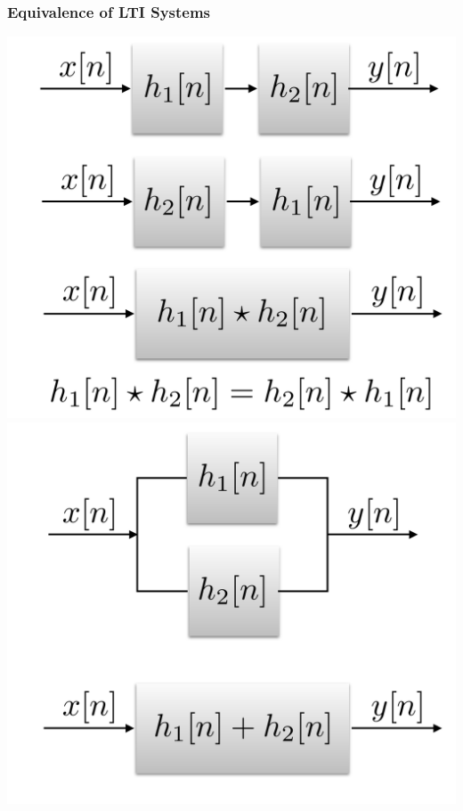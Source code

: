 \documentclass[mathserif,9pt]{beamer}
\begin{document}
\begin{frame}\frametitle{Equivalence of LTI Systems}\small
  \begin{center}
    \includegraphics[height=.45\textheight]{lti_sys_00.pdf} \hspace{2em}
    \includegraphics[height=.45\textheight]{lti_sys_01.pdf}
  \end{center}
\end{frame}
\end{document}
